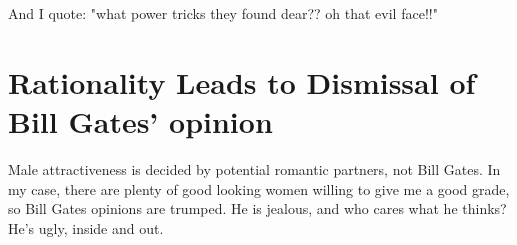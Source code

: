 \documentclass{amsart}
\begin{document}
And I quote:  "what power tricks they found dear?? oh that evil face!!"

\section{Rationality Leads to Dismissal of Bill Gates' opinion}

Male attractiveness is decided by potential romantic partners, not Bill Gates.  In my case, there are plenty of good looking women willing to give me a good grade, so Bill Gates opinions are trumped.  He is jealous, and who cares what he thinks?  He's ugly, inside and out.
\end{document}
